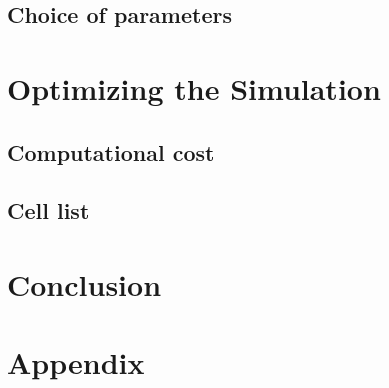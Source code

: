 \documentclass[]{usiinfbachelorproject}
\begin{document}
\subsection{Choice of parameters}

\newpage
\section{Optimizing the Simulation}
\subsection{Computational cost}
\subsection{Cell list}

\newpage
\section{Conclusion}

\newpage
\section{Appendix}

\newpage


\end{document}
